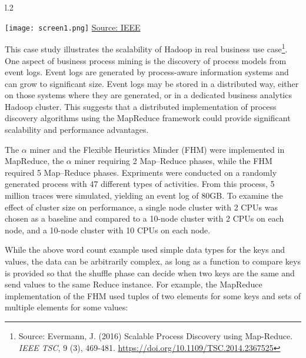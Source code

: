 \begin{wrapfigure}{l}{.2\textwidth}
\begin{center}
\texttt{[image: screen1.png]}
\scriptsize \url{Source: IEEE}
\end{center}
\end{wrapfigure}
This case study illustrates the scalability of Hadoop in real business use case\footnote{Source: Evermann, J. (2016) Scalable Process Discovery using Map-Reduce. \emph{IEEE TSC}, 9 (3), 469-481. \url{https://doi.org/10.1109/TSC.2014.2367525}}. One aspect of business process mining is the discovery of process models from event logs. Event logs are generated by process-aware information systems and can grow to significant size. Event logs may be stored in a distributed way, either on those systems where they are generated, or in a dedicated business analytics Hadoop cluster. This suggests that a distributed implementation of process discovery algorithms using the MapReduce framework could provide significant scalability and performance advantages. 

The $\alpha$ miner and the Flexible Heuristics Minder (FHM) were implemented in MapReduce, the $\alpha$ miner requiring 2 Map--Reduce phases, while the FHM required 5 Map--Reduce phases. Expriments were conducted on a randomly generated process with 47 different types of activities. From this process, 5 million traces were simulated, yielding an event log of 80GB. To examine the effect of cluster size on performance, a single node cluster with 2 CPUs was chosen as a baseline and compared to a 10-node cluster with 2 CPUs on each node, and a 10-node cluster with 10 CPUs on each node. 

While the above word count example used simple data types for the keys and values, the data can be arbitrarily complex, as long as a function to compare keys is provided so that the shuffle phase can decide when two keys are the same and send values to the same Reduce instance. For example, the MapReduce implementation of the FHM used tuples of two elements for some keys and sets of multiple elements for some values:

